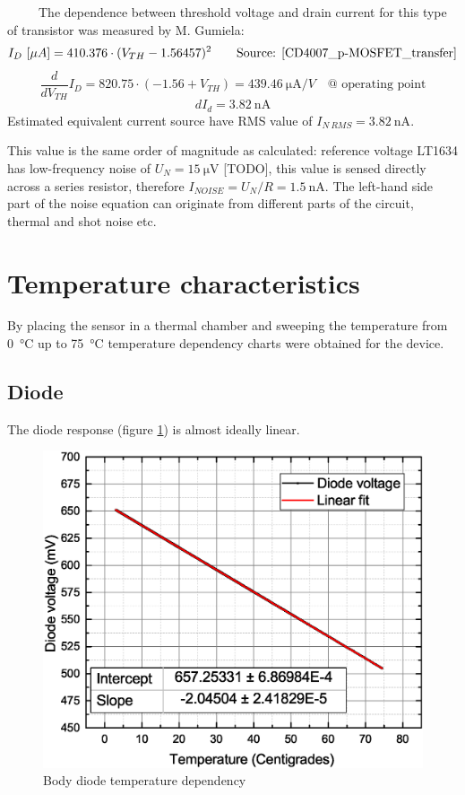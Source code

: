         The dependence between threshold voltage and drain current for this type of transistor was measured by M. Gumiela:
        $$I_D~[\mu A] = 410.376 \cdot (V_{TH} - 1.56457)^2 \text{~~~~~~Source: \ref{CD4007_p-MOSFET_transfer}}$$
        $$\frac{\textit{d}}{\textit{d}V_{TH}} I_D= 820.75 \cdot (-1.56 + V_{TH}) = \SI{439.46}{\uA/V} \text{~~~@ operating point}$$
        $$\textit{d}I_d = \SI{3.82}{\nA}$$
        Estimated equivalent current source have RMS value of $I_{N~RMS} = \SI{3.82}{\nA}$.

        This value is the same order of magnitude as calculated: reference voltage LT1634 has low-frequency noise of $U_N = \SI{15}{\uV}$ [TODO], this value is sensed directly across a series resistor, therefore $I_{NOISE} = U_N/R = \SI{1.5}{\nA}$. The left-hand side part of the noise equation can originate from different parts of the circuit, thermal and shot noise etc. %



\section{Temperature characteristics}
    By placing the sensor in a thermal chamber and sweeping the temperature from \SI{0}{\degreeCelsius} up to \SI{75}{\degreeCelsius} temperature dependency charts were obtained for the device.

    \subsection{Diode}
        The diode response (figure \ref{Body_diode_temperature_dependency}) is almost ideally linear.
        \begin{figure}[H]
            \centering
            \includegraphics[width=0.6\paperwidth]{img/07/diodeVsTemperature.eps}
            \caption{Body diode temperature dependency}
            \label{Body_diode_temperature_dependency}
        \end{figure}


